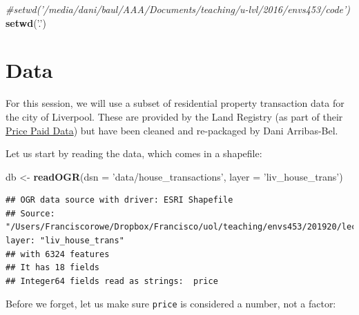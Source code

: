 \documentclass[]{book}
\newenvironment{Shaded}{\begin{snugshade}}{\end{snugshade}}
\newcommand{\KeywordTok}[1]{\textcolor[rgb]{0.13,0.29,0.53}{\textbf{#1}}}
\newcommand{\DataTypeTok}[1]{\textcolor[rgb]{0.13,0.29,0.53}{#1}}
\newcommand{\StringTok}[1]{\textcolor[rgb]{0.31,0.60,0.02}{#1}}
\newcommand{\CommentTok}[1]{\textcolor[rgb]{0.56,0.35,0.01}{\textit{#1}}}
\newcommand{\OperatorTok}[1]{\textcolor[rgb]{0.81,0.36,0.00}{\textbf{#1}}}
\newcommand{\NormalTok}[1]{#1}
\begin{document}
\begin{Shaded}
\begin{Highlighting}[]
\CommentTok{#setwd('/media/dani/baul/AAA/Documents/teaching/u-lvl/2016/envs453/code')}
\KeywordTok{setwd}\NormalTok{(}\StringTok{'.'}\NormalTok{)}
\end{Highlighting}
\end{Shaded}

\section{Data}\label{data}

For this session, we will use a subset of residential property
transaction data for the city of Liverpool. These are provided by the
Land Registry (as part of their
\href{https://www.gov.uk/government/collections/price-paid-data}{Price
Paid Data}) but have been cleaned and re-packaged by Dani Arribas-Bel.

Let us start by reading the data, which comes in a shapefile:

\begin{Shaded}
\begin{Highlighting}[]
\NormalTok{db <-}\StringTok{ }\KeywordTok{readOGR}\NormalTok{(}\DataTypeTok{dsn =} \StringTok{'data/house_transactions'}\NormalTok{, }\DataTypeTok{layer =} \StringTok{'liv_house_trans'}\NormalTok{)}
\end{Highlighting}
\end{Shaded}

\begin{verbatim}
## OGR data source with driver: ESRI Shapefile 
## Source: "/Users/Franciscorowe/Dropbox/Francisco/uol/teaching/envs453/201920/lectures/san/data/house_transactions", layer: "liv_house_trans"
## with 6324 features
## It has 18 fields
## Integer64 fields read as strings:  price
\end{verbatim}

Before we forget, let us make sure \texttt{price} is considered a
number, not a factor:

\begin{Shaded}
\end{Shaded}
\end{document}
